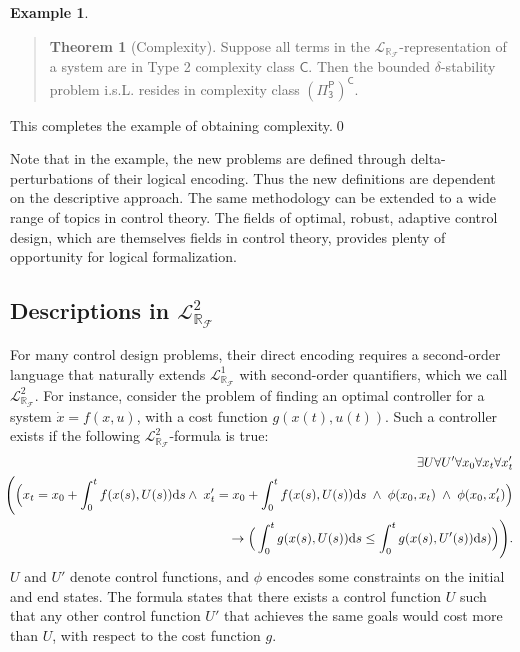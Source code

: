 \documentclass[10pt]{article}
\newcommand{\lrf}{\mathcal{L}_{\mathbb{R}_{\mathcal{F}}}}
\theoremstyle{definition}
\newtheorem{example}{Example}[section]
\newtheorem{theorem}{Theorem}[section]
\begin{document}
\begin{example}
\begin{quote}
\vspace{-.5cm}
\begin{theorem}[Complexity]
Suppose all terms in the $\lrf$-representation of a system are in Type 2 complexity class $\mathsf{C}$.  Then the bounded $\delta$-stability problem i.s.L. resides in complexity class $\mathsf{(\Pi^P_3)^C}$. 
\end{theorem}
\end{quote}
This completes the example of obtaining complexity.\qed
\end{example}
Note that in the example, the new problems are defined through delta-perturbations of their logical encoding. Thus the new definitions are dependent on the descriptive approach. The same methodology can be extended to a wide range of topics in control theory. The fields of optimal, robust, adaptive control design, which are themselves fields in control theory, provides plenty of opportunity for logical formalization.

\subsection{Descriptions in $\lrf^2$}\label{second-order}

For many control design problems, their direct encoding requires a second-order language that naturally extends $\lrf^1$ with second-order quantifiers, which we call $\lrf^2$. For instance, consider the problem of finding an optimal controller for a system $\dot x = f({x}, u)$, with a cost function $g(x(t),u(t))$. Such a controller exists if the following $\lrf^2$-formula is true:
\begin{eqnarray*}
& &\hspace{-.7cm}\exists U \forall U' \forall {x_0}\forall {x_t} \forall {x_t'}\\
& &\hspace{-.7cm}\Bigg( \Big({x_t} = {x_0} + \int_{0}^t f({x}(s),U(s))\mathrm{d}s \wedge\;  x_t' = x_0 + \int_{0}^t f(x(s),U(s))\mathrm{d}s
\;\wedge\; \phi(x_0, x_t) \;\wedge\; \phi(x_0, x_t')\Big)\\
& &\hspace{5.7cm}\rightarrow \Big(\int_0^t g(x(s),U(s))\mathrm{d}s \leq  \int_0^t g(x(s),U'(s))\mathrm{d}s)\Big) \Bigg).
\end{eqnarray*}
$U$ and $U'$ denote control functions, and $\phi$ encodes some constraints on the initial and end states. The formula states that there exists a control function $U$ such that any other control function $U'$ that achieves the same goals would cost more than $U$, with respect to the cost function $g$. 
\end{document}
